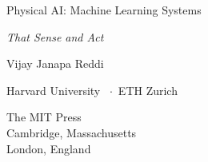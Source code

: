 {\begin{titlepage}
  {\fontsize{15pt}{17pt}\rmfamily\selectfont Physical AI: Machine Learning Systems\par}
  \vspace{0.8\baselineskip}
  {\fontsize{12pt}{14pt}\rmfamily\itshape\color{accentcolor}That Sense and Act\par}

  \vspace{10\baselineskip}

  {\fontsize{14pt}{16pt}\rmfamily\selectfont Vijay Janapa Reddi\par}
  \vspace{0.4\baselineskip}
  {\fontsize{10pt}{12pt}\rmfamily\selectfont\color{softink}Harvard University \ $\cdot$\  ETH Zurich\par}

  \vfill

  {\fontsize{11pt}{13pt}\rmfamily\selectfont%
   The MIT Press\\[0.4ex]%
   Cambridge, Massachusetts\\[0.4ex]%
   London, England%
  \par}

  \vspace*{0.02\textheight}
\end{titlepage}%

}
\makeatother
